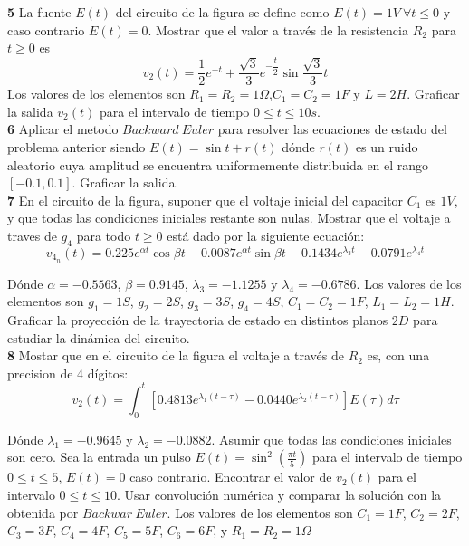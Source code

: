 \documentclass[10pt,a4paper]{article} %
\begin{document}
	\textbf{5} La fuente $E(t)$ del circuito de la figura se define como $E(t)=1V\ \forall t\leq 0$ y caso contrario $E(t)=0$. Mostrar que el valor a través de la resistencia $R_2$ para $t\geq 0$ es
	\begin{equation}
		v_2(t)=\frac{1}{2}e^{-t}+\frac{\sqrt{3}}{3}e^{-\dfrac{t}{2}}\sin \frac{\sqrt{3}}{3}t
	\end{equation}
	Los valores de los elementos son $R_1=R_2=1\Omega$,$C_1=C_2=1F$ y $L=2H$. Graficar la salida $v_2(t)$ para el intervalo de tiempo $0\leq t \leq 10s$.\\
	
	\textbf{6} Aplicar el metodo $Backward\ Euler$ para resolver las ecuaciones de estado del problema anterior siendo $E(t)=\sin t + r(t)$ dónde $r(t)$ es un ruido aleatorio cuya amplitud se encuentra uniformemente distribuida en el rango $[-0.1,0.1]$. Graficar la salida.\\
	
	\textbf{7} En el circuito de la figura, suponer que el voltaje inicial del capacitor $C_1$ es $1V$, y que todas las condiciones iniciales restante son nulas. Mostrar que el voltaje a traves de $g_4$ para todo $t\geq 0$ está dado por la siguiente ecuación:
	\begin{equation}
		v_{4_n}(t)=0.225e^{\alpha t}\cos \beta t-0.0087e^{\alpha t}\sin \beta t-0.1434e^{\lambda_3 t}-0.0791e^{\lambda_4 t}
	\end{equation}
	
	Dónde $\alpha=-0.5563$, $\beta=0.9145$, $\lambda_3=-1.1255$ y $\lambda_4=-0.6786$. Los valores de los elementos son $g_1=1S$, $g_2=2S$, $g_3=3S$, $g_4=4S$, $C_1=C_2=1F$, $L_1=L_2=1H$. Graficar la proyección de la trayectoria de estado en distintos planos $2D$ para estudiar la dinámica del circuito.\\
	
	\textbf{8} Mostar que en el circuito de la figura el voltaje a través de $R_2$ es, con una precision de 4 dígitos:
	\begin{equation}
		v_2(t)=\int_{0}^{t}\left[0.4813e^{\lambda_1(t-\tau)}-0.0440e^{\lambda_2(t-\tau)}\right]E(\tau)d\tau
	\end{equation}
	
	Dónde $\lambda_1=-0.9645$ y $\lambda_2=-0.0882$. Asumir que todas las condiciones iniciales son cero. Sea la entrada un pulso $E(t)=\sin^2(\frac{\pi t}{5})$ para el intervalo de tiempo $0\leq t\leq 5$, $E(t)=0$ caso contrario. Encontrar el valor de $v_2(t)$ para el intervalo $0\leq t\leq 10$. Usar convolución numérica y comparar la solución con la obtenida por $Backwar\ Euler$. Los valores de los elementos son $C_1=1F$, $C_2=2F$, $C_3=3F$, $C_4=4F$, $C_5=5F$, $C_6=6F$, y $R_1=R_2=1\Omega$\\
	
\end{document}
